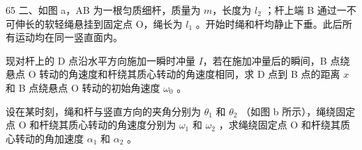 \begin{problem}[33届物理竞赛决赛]{65}
    二、如图 a，AB 为一根匀质细杆，质量为 $m$，长度为 $l_{2}$ ；杆上端 B 通过一不可伸长的软轻绳悬挂到固定点 O，绳长为 $l_{1}$ 。开始时绳和杆均静止下垂。此后所有运动均在同一竖直面内。
    \begin{subproblem}
        现对杆上的 D 点沿水平方向施加一瞬时冲量 $I$，若在施加冲量后的瞬间，B 点绕悬点 O 转动的角速度和杆绕其质心转动的角速度相同，求 D 点到 B 点的距离 $x$ 和 B 点绕悬点 O 转动的初始角速度 $\omega_{0}$ 。
    \end{subproblem}
    \begin{subproblem}
        设在某时刻，绳和杆与竖直方向的夹角分别为 $\theta_{1}$ 和 $\theta_{2}$ （如图 b 所示），绳绕固定点 O 和杆绕其质心转动的角速度分别为 $\omega_{1}$ 和 $\omega_{2}$ ，求绳绕固定点 O 和杆绕其质心转动的角加速度 $\alpha_{1}$ 和 $\alpha_{2}$ 。
    \end{subproblem}
\end{problem}